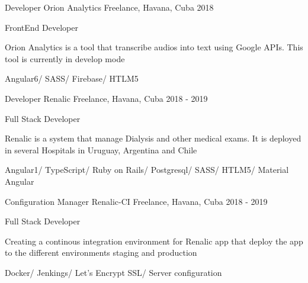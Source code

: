 \begin{cventries}
\cventry
{Developer} %
{Orion Analytics} %
{Freelance, Havana, Cuba} %
{2018} %
{ %
\begin{cvitems}
\item {FrontEnd Developer}
\item {Orion Analytics is a tool that transcribe audios into text using Google APIs. This tool is currently in develop mode}
\item {Angular6/ SASS/ Firebase/ HTLM5}
\end{cvitems}
}


\cventry
{Developer} %
{Renalic} %
{Freelance, Havana, Cuba} %
{2018 - 2019} %
{ %
\begin{cvitems}
\item {Full Stack Developer}
\item {Renalic is a system that manage Dialysis and other medical exams. It is deployed in several Hospitals in Uruguay, Argentina and Chile}
\item {Angular1/ TypeScript/ Ruby on Rails/ Postgresql/ SASS/ HTLM5/ Material Angular}
\end{cvitems}
}


\cventry
{Configuration Manager} %
{Renalic-CI} %
{Freelance, Havana, Cuba} %
{2018 - 2019} %
{ %
\begin{cvitems}
\item {Full Stack Developer}
\item {Creating a continous integration environment for Renalic app that deploy the app to the different environments staging and production}
\item {Docker/ Jenkings/ Let's Encrypt SSL/ Server configuration}
\end{cvitems}
}


\end{cventries}


